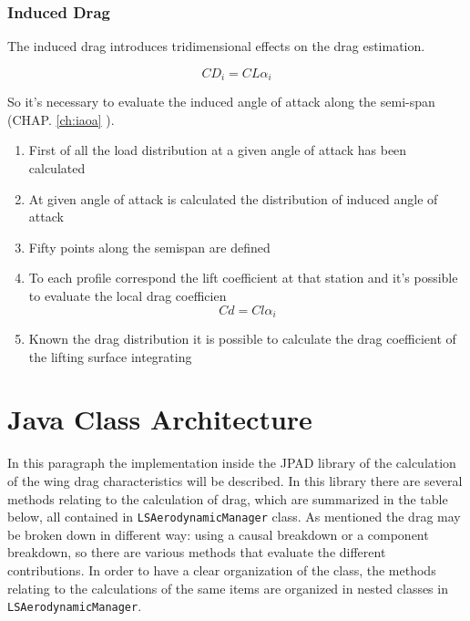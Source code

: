 \subsubsection{Induced Drag}

The induced drag introduces tridimensional effects on the drag estimation.

\begin{equation}
CD_i = CL \alpha_i
\end{equation}

So it's necessary to evaluate the induced angle of attack along the semi-span (CHAP. \ref{ch:iaoa} ).
	
\begin{enumerate}
	\item First of all the load distribution at a given angle of attack has been calculated
	\item At given angle of attack is calculated the distribution of induced angle of attack
	\item Fifty points along the semispan are defined
	\item To each profile correspond the lift coefficient at that station and it's possible to evaluate the local drag coefficien
	\begin{equation}
	Cd =Cl \alpha_i
	\end{equation}
	\item Known the drag distribution it is possible to calculate the drag coefficient of the lifting surface integrating
\end{enumerate}



\section{Java Class Architecture}

In this paragraph the implementation inside the JPAD library of the calculation of the wing drag characteristics will be described. In this library there are several methods relating to the calculation of drag, which are summarized in the table below, all contained in \texttt{LSAerodynamicManager} class. As mentioned the drag may be broken down in different way: using a causal breakdown or a component breakdown, so there are various methods that evaluate the different contributions. In order to have a clear organization of the class, the methods relating to the calculations of the same items are organized in nested classes in  \texttt{LSAerodynamicManager}.\\ 

